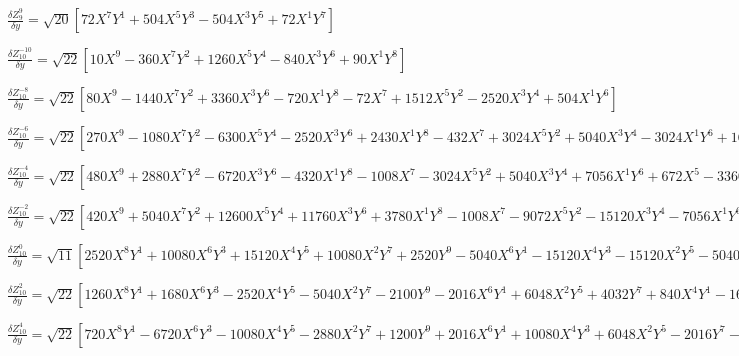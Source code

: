 \documentclass[10pt,landscape]{article}
\begin{document}
\vspace{1.2 mm}
\noindent $ \frac{\delta Z^{9}_{9}}{\delta y} = \sqrt{20} [72X^{7}Y^{1} +504X^{5}Y^{3} -504X^{3}Y^{5} +72X^{1}Y^{7}] $

\vspace{1.2 mm}
\noindent $ \frac{\delta Z^{-10}_{10}}{\delta y} = \sqrt{22} [10X^{9} -360X^{7}Y^{2} +1260X^{5}Y^{4} -840X^{3}Y^{6} +90X^{1}Y^{8}] $

\vspace{1.2 mm}
\noindent $ \frac{\delta Z^{-8}_{10}}{\delta y} = \sqrt{22} [80X^{9} -1440X^{7}Y^{2} +3360X^{3}Y^{6} -720X^{1}Y^{8} -72X^{7} +1512X^{5}Y^{2} -2520X^{3}Y^{4} +504X^{1}Y^{6}] $

\vspace{1.2 mm}
\noindent $ \frac{\delta Z^{-6}_{10}}{\delta y} = \sqrt{22} [270X^{9} -1080X^{7}Y^{2} -6300X^{5}Y^{4} -2520X^{3}Y^{6} +2430X^{1}Y^{8} -432X^{7} +3024X^{5}Y^{2} +5040X^{3}Y^{4} -3024X^{1}Y^{6} +168X^{5} -1680X^{3}Y^{2} +840X^{1}Y^{4}] $

\vspace{1.2 mm}
\noindent $ \frac{\delta Z^{-4}_{10}}{\delta y} = \sqrt{22} [480X^{9} +2880X^{7}Y^{2} -6720X^{3}Y^{6} -4320X^{1}Y^{8} -1008X^{7} -3024X^{5}Y^{2} +5040X^{3}Y^{4} +7056X^{1}Y^{6} +672X^{5} -3360X^{1}Y^{4} -140X^{3} +420X^{1}Y^{2}] $

\vspace{1.2 mm}
\noindent $ \frac{\delta Z^{-2}_{10}}{\delta y} = \sqrt{22} [420X^{9} +5040X^{7}Y^{2} +12600X^{5}Y^{4} +11760X^{3}Y^{6} +3780X^{1}Y^{8} -1008X^{7} -9072X^{5}Y^{2} -15120X^{3}Y^{4} -7056X^{1}Y^{6} +840X^{5} +5040X^{3}Y^{2} +4200X^{1}Y^{4} -280X^{3} -840X^{1}Y^{2} +30X^{1}] $

\vspace{1.2 mm}
\noindent $ \frac{\delta Z^{0}_{10}}{\delta y} = \sqrt{11} [2520X^{8}Y^{1} +10080X^{6}Y^{3} +15120X^{4}Y^{5} +10080X^{2}Y^{7} +2520Y^{9} -5040X^{6}Y^{1} -15120X^{4}Y^{3} -15120X^{2}Y^{5} -5040Y^{7} +3360X^{4}Y^{1} +6720X^{2}Y^{3} +3360Y^{5} -840X^{2}Y^{1} -840Y^{3} +60Y^{1}] $

\vspace{1.2 mm}
\noindent $ \frac{\delta Z^{2}_{10}}{\delta y} = \sqrt{22} [1260X^{8}Y^{1} +1680X^{6}Y^{3} -2520X^{4}Y^{5} -5040X^{2}Y^{7} -2100Y^{9} -2016X^{6}Y^{1} +6048X^{2}Y^{5} +4032Y^{7} +840X^{4}Y^{1} -1680X^{2}Y^{3} -2520Y^{5} +560Y^{3} -30Y^{1}] $

\vspace{1.2 mm}
\noindent $ \frac{\delta Z^{4}_{10}}{\delta y} = \sqrt{22} [720X^{8}Y^{1} -6720X^{6}Y^{3} -10080X^{4}Y^{5} -2880X^{2}Y^{7} +1200Y^{9} +2016X^{6}Y^{1} +10080X^{4}Y^{3} +6048X^{2}Y^{5} -2016Y^{7} -1680X^{4}Y^{1} -3360X^{2}Y^{3} +1008Y^{5} +420X^{2}Y^{1} -140Y^{3}] $
\end{document}
